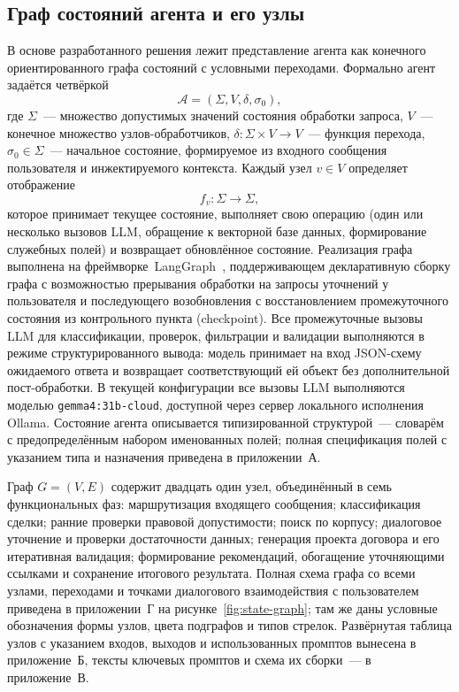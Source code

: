 \subsection{Граф состояний агента и его узлы}

В основе разработанного решения лежит представление агента как конечного ориентированного графа состояний с условными переходами. Формально агент задаётся четвёркой
\begin{equation}
\mathcal{A} = (\Sigma, V, \delta, \sigma_0),
\end{equation}
где $\Sigma$~--- множество допустимых значений состояния обработки запроса, $V$~--- конечное множество узлов-обработчиков, $\delta: \Sigma \times V \rightarrow V$~--- функция перехода, $\sigma_0 \in \Sigma$~--- начальное состояние, формируемое из входного сообщения пользователя и инжектируемого контекста. Каждый узел $v \in V$ определяет отображение
\begin{equation}
f_v: \Sigma \rightarrow \Sigma,
\end{equation}
которое принимает текущее состояние, выполняет свою операцию (один или несколько вызовов LLM, обращение к векторной базе данных, формирование служебных полей) и возвращает обновлённое состояние. Реализация графа выполнена на фреймворке~LangGraph~\cite{langgraph_docs}, поддерживающем декларативную сборку графа с возможностью прерывания обработки на запросы уточнений у пользователя и последующего возобновления с восстановлением промежуточного состояния из контрольного пункта (checkpoint). Все промежуточные вызовы LLM для классификации, проверок, фильтрации и валидации выполняются в режиме структурированного вывода: модель принимает на вход JSON-схему ожидаемого ответа и возвращает соответствующий ей объект без дополнительной пост-обработки. В текущей конфигурации все вызовы LLM выполняются моделью \texttt{gemma4:31b-cloud}, доступной через сервер локального исполнения Ollama. Состояние агента описывается типизированной структурой~--- словарём с предопределённым набором именованных полей; полная спецификация полей с указанием типа и назначения приведена в приложении~А.

Граф $G = (V, E)$ содержит двадцать один узел, объединённый в семь функциональных фаз: маршрутизация входящего сообщения; классификация сделки; ранние проверки правовой допустимости; поиск по корпусу; диалоговое уточнение и проверки достаточности данных; генерация проекта договора и его итеративная валидация; формирование рекомендаций, обогащение уточняющими ссылками и сохранение итогового результата. Полная схема графа со всеми узлами, переходами и точками диалогового взаимодействия с пользователем приведена в приложении~Г на рисунке~\ref{fig:state-graph}; там же даны условные обозначения формы узлов, цвета подграфов и типов стрелок. Развёрнутая таблица узлов с указанием входов, выходов и использованных промптов вынесена в приложение~Б, тексты ключевых промптов и схема их сборки~--- в приложение~В.


